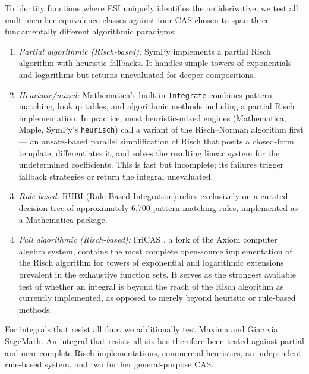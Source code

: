 \documentclass[preprint,12pt,authoryear]{elsarticle}
\newcommand{\codexadd}[1]{{\color{purple}#1}}
\newcommand{\hd}[1]{{\color{red}\textbf{[HD: #1]}}}
\begin{document}
To identify functions where ESI uniquely identifies the antiderivative, we test all multi-member equivalence classes against four CAS chosen to span three fundamentally different algorithmic paradigms:
\begin{enumerate}
\item \emph{Partial algorithmic (Risch-based):} SymPy \citep{Meurer2017} implements a partial Risch algorithm \citep{Risch1969} with heuristic fallbacks. It handles simple towers of exponentials and logarithms but returns unevaluated for deeper compositions.
\item \emph{Heuristic/mixed:} Mathematica's built-in \texttt{Integrate} \citep{Mathematica} combines pattern matching, lookup tables, and algorithmic methods including a partial Risch implementation.
In practice, most heuristic-mixed engines (Mathematica, Maple, SymPy's \texttt{heurisch}) call a variant of the Risch--Norman algorithm \citep{Moses1971,NormanMoore1977} first --- an ansatz-based parallel simplification of Risch that posits a closed-form template, differentiates it, and solves the resulting linear system for the undetermined coefficients. This is fast but incomplete; its failures trigger fallback strategies or return the integral unevaluated.
\item \emph{Rule-based:} RUBI \citep{RichScheibeAbbasi2018,Rubi2024} (Rule-Based Integration) relies exclusively on a curated decision tree of approximately 6{,}700 pattern-matching rules, implemented as a Mathematica package.
\item \emph{Full algorithmic (Risch-based):} FriCAS \citep{FriCAS2024}, a fork of the Axiom computer algebra system, contains the most complete open-source implementation of the Risch algorithm for towers of exponential and logarithmic extensions prevalent in the exhaustive function sets. It serves as the strongest available test of whether an integral is beyond the reach of the Risch algorithm as currently implemented, as opposed to merely beyond heuristic or rule-based methods.
\end{enumerate}
\codexadd{For integrals that resist all four, we additionally test Maxima \citep{Maxima2024} and Giac \citep{Giac2024} via SageMath. An integral that resists all six has therefore been tested against partial and near-complete Risch implementations, commercial heuristics, an independent rule-based system, and two further general-purpose CAS.}
\end{document}
